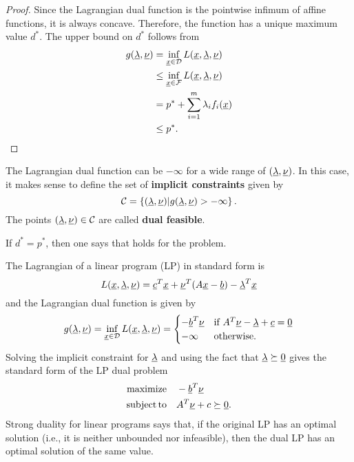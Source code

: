 \begin{proof}
Since the Lagrangian dual function is the pointwise infimum of affine functions, it is always concave.
Therefore, the function has a unique maximum value $d^*$.
The upper bound on $d^*$ follows from
\begin{align*}
g(\underline{\lambda},\underline{\nu})
&= \inf_{\underline{x}\in \mathcal{D}} L(\underline{x},\underline{\lambda},\underline{\nu}) \\
&\leq \inf_{\underline{x}\in \mathcal{F}} L(\underline{x},\underline{\lambda},\underline{\nu}) \\
&= p^* + \sum_{i=1}^m \lambda_i f_i (\underline{x}) \\
&\leq p^*.
\end{align*}
\end{proof}

The Lagrangian dual function can be $-\infty$ for a wide range of $(\underline{\lambda},\underline{\nu})$.
In this case, it makes sense to define the set of \textbf{implicit constraints} given by
\[ \mathcal{C} = \left\{ (\underline{\lambda},\underline{\nu}) |  g(\underline{\lambda},\underline{\nu}) > -\infty \right\}. \]
The points $(\underline{\lambda},\underline{\nu}) \in \mathcal{C}$ are called \textbf{dual feasible}.

\begin{definition}
If $d^* = p^*$, then one says that  holds for the problem.
\end{definition}

\begin{example}
The Lagrangian of a linear program (LP) in standard form is
\[ L(\underline{x},\underline{\lambda},\underline{\nu}) = \underline{c}^T \underline{x} + \underline{\nu}^T (A\underline{x}-\underline{b}) - \underline{\lambda}^T \underline{x} \]
and the Lagrangian dual function is given by
\begin{equation*}
g(\underline{\lambda},\underline{\nu})
= \inf_{\underline{x}\in \mathcal{D}} L(\underline{x},\underline{\lambda},\underline{\nu})
= \begin{cases} -\underline{b}^T \underline{\nu} & \text{if }A^T \underline{\nu} - \underline{\lambda} + \underline{c} = \underline{0} \\
-\infty & \text{otherwise}. \end{cases}
\end{equation*}
Solving the implicit constraint for $\underline{\lambda}$ and using the fact that $\underline{\lambda} \succeq \underline{0}$ gives the standard form of the LP dual problem
\begin{align*}
\mathrm{maximize} \quad & -\underline{b}^T \underline{\nu} \\
\mathrm{subject\,to} \quad & A^T \underline{\nu} + c \succeq \underline{0}.
\end{align*}
Strong duality for linear programs says that, if the original LP has an optimal solution (i.e., it is neither unbounded nor infeasible), then the dual LP has an optimal solution of the same value.
\end{example}

